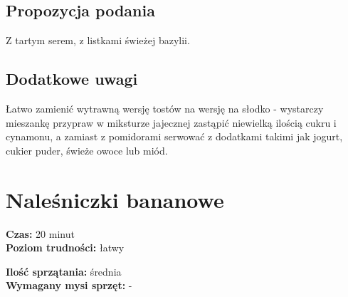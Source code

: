 \documentclass[a4paper,10pt]{book}
\begin{document}
\vspace{0.5cm} 

\small
\subsection*{Propozycja podania}
Z tartym serem, z listkami świeżej bazylii.

\vspace{0.3cm}

\subsection*{Dodatkowe uwagi}
Łatwo zamienić wytrawną wersję tostów na wersję na słodko - wystarczy mieszankę przypraw w miksturze jajecznej zastąpić niewielką ilością cukru i cynamonu, a zamiast z pomidorami serwować z dodatkami takimi jak jogurt, cukier puder, świeże owoce lub miód.

\newpage 

\section{Naleśniczki bananowe}
\bigskip
\small
\begin{minipage}{0.45\textwidth}
    \noindent \textbf{Czas:} 20 minut \\
    \textbf{Poziom trudności:} łatwy
\end{minipage}
\begin{minipage}{0.45\textwidth}
    \noindent \textbf{Ilość sprzątania:} średnia \\
    \textbf{Wymagany mysi sprzęt:} -
\end{minipage}
\normalsize
\vspace{0.5cm}
\end{document}
